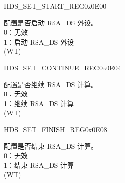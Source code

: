 \begin{register}{H}{DS\_SET\_START\_REG}{0x0E00}\label{regdesc:DSSETSTARTREG}
%
%
\regnewline%
\begin{regdesc}\begin{reglist}
\label{fielddesc:DSSETSTART}\item [DS\_SET\_START] 配置是否启动 RSA\_DS 外设。\\
0：无效\\
1：启动 RSA\_DS 外设\\
(WT)
\end{reglist}\end{regdesc}
\end{register}


\begin{register}{H}{DS\_SET\_CONTINUE\_REG}{0x0E04}\label{regdesc:DSSETCONTINUEREG}
%
%
\regnewline%
\begin{regdesc}\begin{reglist}
\label{fielddesc:DSSETCONTINUE}\item [DS\_SET\_CONTINUE] 配置是否继续 RSA\_DS 计算。\\
0：无效\\
1：继续 RSA\_DS 计算\\
(WT)
\end{reglist}\end{regdesc}
\end{register}


\begin{register}{H}{DS\_SET\_FINISH\_REG}{0x0E08}\label{regdesc:DSSETFINISHREG}
%
%
\regnewline%
\begin{regdesc}\begin{reglist}
\label{fielddesc:DSSETFINISH}\item [DS\_SET\_FINISH] 配置是否结束 RSA\_DS 计算。\\
0：无效\\
1：结束 RSA\_DS 计算\\
(WT)
\end{reglist}\end{regdesc}
\end{register}


